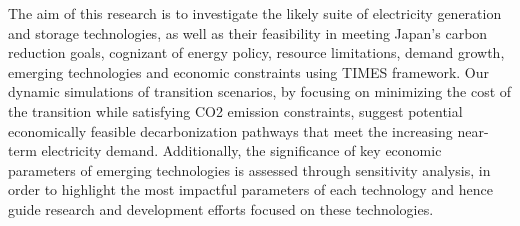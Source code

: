 The aim of this research is to investigate the likely suite of electricity generation and storage technologies, as well as their feasibility in meeting Japan's carbon reduction goals, cognizant of energy policy, resource limitations, demand growth, emerging technologies and economic constraints using \gls{TIMES} framework. Our dynamic simulations of transition scenarios, by focusing on minimizing the cost of the transition while satisfying CO2 emission constraints, suggest potential economically feasible decarbonization pathways that meet the increasing near-term electricity demand. Additionally, the significance of key economic parameters of emerging technologies is assessed through sensitivity analysis, in order to highlight the most impactful parameters of each technology and hence guide research and development efforts focused on these technologies.
